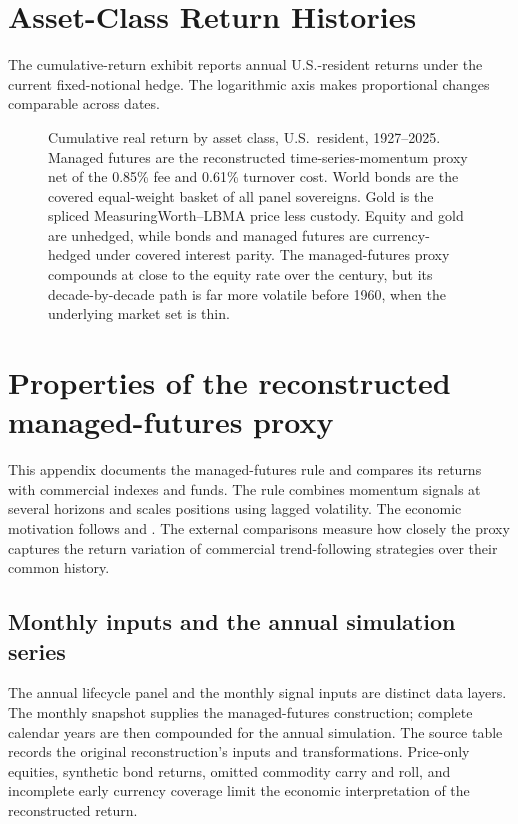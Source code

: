 \section{Asset-Class Return Histories}
\label{app:returns}
The cumulative-return exhibit reports annual U.S.-resident returns under the
current fixed-notional hedge. The logarithmic axis makes proportional changes
comparable across dates.
\begin{figure}[H]
\centering

\caption{Cumulative real return by asset class, U.S.\ resident, 1927--2025.
Managed futures are the reconstructed time-series-momentum proxy net of the
0.85\% fee and 0.61\% turnover cost. World bonds are the covered equal-weight
basket of all panel sovereigns. Gold is the spliced MeasuringWorth--LBMA price less custody.
Equity and gold are unhedged, while bonds and managed futures are currency-hedged
under covered interest parity. The managed-futures proxy compounds at close to
the equity rate over the century, but its decade-by-decade path is far more
volatile before 1960, when the underlying market set is thin.}
\label{fig:cumwealth}
\end{figure}

\section{Properties of the reconstructed managed-futures proxy}
\label{app:mf-proxy}
This appendix documents the managed-futures rule and compares its returns
with commercial indexes and funds. The rule combines
momentum signals at several horizons and scales positions using lagged
volatility. The economic motivation follows \citet{MoskowitzOoiPedersen2012}
and \citet{HurstOoiPedersen2017}. The external comparisons measure how closely the proxy captures the
return variation of commercial trend-following strategies over their common history.

\subsection{Monthly inputs and the annual simulation series}
\label{app:mf-monthly-data}
The annual lifecycle panel and the monthly signal inputs are distinct data
layers. The monthly snapshot supplies the managed-futures construction;
complete calendar years are then compounded for the annual simulation.
The source table records the original reconstruction's inputs and
transformations. Price-only equities, synthetic bond returns, omitted
commodity carry and roll, and incomplete early currency coverage limit the
economic interpretation of the reconstructed return.

